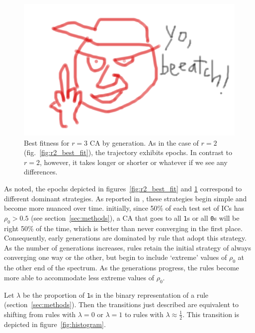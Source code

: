 \begin{figure} [ht]
\begin{center}
\includegraphics[width=\linewidth]{foo.png}
\caption{Best fitness for $r = 3$ CA by generation. As in the case of $r = 2$ (fig.~\ref{fig:r2_best_fit}), the trajectory exhibits epochs. In contrast to $r = 2$, 
however, it takes longer or shorter or whatever if we see any differences.}
\label{fig:r3_best_fit}
\end{center}
\end{figure}

As noted, the epochs depicted in figures~\ref{fig:r2_best_fit} and \ref{fig:r3_best_fit} correspond to different dominant strategies. As reported in 
\cite{Mitchell:1994:ECA:186092.186116}, these strategies begin simple and become more nuanced over time. initially, since 50\% of each test set of ICs 
has $\rho_0 > 0.5$ (see section~\ref{sec:methods}), a CA that goes to all \texttt{1}s or all \texttt{0}s will be right 50\% of the time, which is better than never converging in the first place. Consequently, early generations are dominated by rule that adopt this strategy. As the number of generations increases, 
rules retain the initial strategy of always converging one way or the other, but begin to include `extreme' values of $\rho_0$ at the other end of the spectrum. 
As the generations progress, the rules become more able to accommodate less extreme values of $\rho_0$.

Let $\lambda$ be the proportion of \texttt{1}s in the binary representation of a rule (section~\ref{sec:methods}). Then the transitions just described are 
equivalent to shifting from rules with $\lambda = 0$ or $\lambda = 1$ to rules with $\lambda \approx \frac{1}{2}$. This transition is depicted in 
figure~\ref{fig:histogram}.

